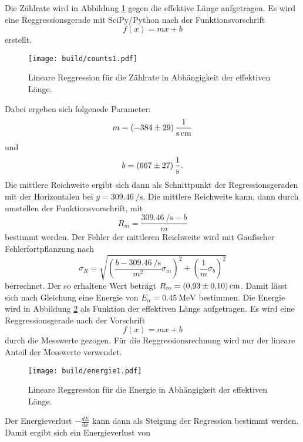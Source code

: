 \noindent Die Zählrate wird in Abbildung \ref{fig:c1} gegen die effektive Länge aufgetragen.
Es wird eine Reggressionsgerade mit SciPy/Python nach der Funktionsvorschrift
\begin{equation*}
  f(x) = mx +b
\end{equation*}
erstellt.
\begin{figure}[H]
  \centering
  \texttt{[image: build/counts1.pdf]}
  \caption{Lineare Reggression für die Zählrate in Abhängigkeit der effektiven Länge.}
  \label{fig:c1}
\end{figure}
\noindent Dabei ergeben sich folgenede Parameter:
\begin{equation*}
  m =\SI{-384\pm29}{\per\second\per\centi\meter}
\end{equation*}
und
\begin{equation*}
  b =\SI{667\pm27}{\per\second}.
\end{equation*}
Die mittlere Reichweite ergibt sich dann als Schnittpunkt der Regressionsgeraden mit der Horizontalen bei $y=\SI{309.46}{\per\second}$.
Die mittlere Reichweite kann, dann durch umstellen der Funktionsvorschrift, mit
\begin{equation*}
  R_m=\frac{\SI{309.46}{\per\second}-b}{m}
\end{equation*}
bestimmt werden.
Der Fehler der mittleren Reichweite wird mit Gaußscher Fehlerfortpflanzung nach
\begin{equation*}
  \sigma_R = \sqrt{\left(\frac{b-\SI{309.46}{\per\second}}{m^2}\sigma_m\right)^2 +\left(\frac{1}{m}\sigma_b\right)^2}
\end{equation*}
berrechnet.
Der so erhaltene Wert beträgt $R_m= \SI{0.93\pm0.1}{\centi\meter}$.
Damit lässt sich nach Gleichung eine Energie von $E_{\alpha} = \SI{0.45}{\mega\electronvolt}$ bestimmen.
Die Energie wird in Abbildung \ref{fig:e1} als Funktion der effektiven Länge aufgetragen.
Es wird eine Reggressionsgerade nach der Vorschrift
\begin{equation*}
  f(x) = mx + b
\end{equation*}
durch die Messwerte gezogen.
Für die Reggressionsrechnung wird nur der lineare Anteil der Messwerte verwendet.
\begin{figure}[H]
  \centering
  \texttt{[image: build/energie1.pdf]}
  \caption{Lineare Reggression für die Energie in Abhängigkeit der effektiven Länge.}
  \label{fig:e1}
\end{figure}
\noindent Der Energieverlust $-\frac{dE}{dx}$ kann dann als Steigung der Regression bestimmt werden.
Damit ergibt sich ein Energieverlust von
